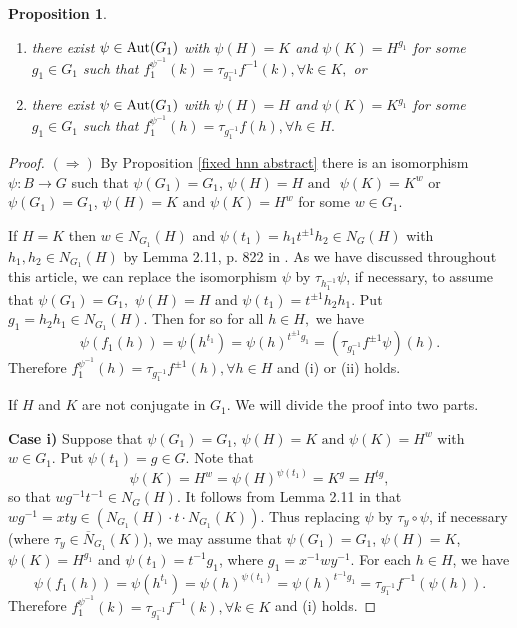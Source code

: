 \documentclass[a4paper,12pt]{article}
\newtheorem{prop}[thm]{Proposition}
\def\aut {{\rm Aut}}
\begin{document}
{\begin{prop}
\begin{enumerate}
\item [(i)] there exist $\psi\in \aut(G_1)$ with $\psi(H)=K $ and $ \psi(K)=H^{g_1}$ for some $g_1 \in G_1$ such that $f_1^{\psi^{-1}}(k)= \tau_{g_1^{-1}} f^{- 1}(k), \forall k \in K,$ %
or 
\item [(ii)] there exist $\psi\in \aut(G_1)$ with $\psi(H)=H $ and $ \psi(K)=K^{g_1}$ for some $g_1 \in G_1$ such that $f_1^{\psi^{-1}}(h)= \tau_{g_1^{-1}} f(h), \forall h \in H.$ 
\end{enumerate}



\end{prop}

\begin{proof}
$(\Rightarrow)$ By Proposition \ref{fixed hnn abstract} there is an isomorphism $\psi: B \longrightarrow G$ such that $\psi(G_1) = G_1$,  $\psi(H)=H \mbox{ and }$ $\psi(K)=K^{w}$ or  $\psi(G_1) = G_1$, $\psi(H)=K \mbox{ and } \psi(K)=H^{w}$ for some $w\in G_1$.  

 If $H=K$ then $w\in N_{G_{1}}(H)$ and $\psi(t_1)=h_1t^{\pm 1}h_2\in N_{G}(H)$ with $h_1, h_2 \in N_{G_1}(H)$ by Lemma 2.11, p. 822 in \cite{BZ}.  As we have discussed throughout this article, we can replace the isomorphism $\psi$ by $\tau_{h_{1}^{-1}}\psi$, if necessary, to assume that $\psi(G_1)=G_1,$
  $\psi(H)=H$ and $\psi(t_1)= t^{\pm 1}h_2h_1.$ Put $g_1=h_2h_1 \in N_{G_1}(H)$. Then for  so for all $h \in H,$ we have $$\psi(f_1(h))=\psi(h^{t_1})=\psi(h)^{t^{\pm 1}g_1}=(\tau_{g_1^{-1}}f^{\pm 1}  \psi)(h).$$ 
 Therefore $f_1^{\psi^{-1}}(h) = \tau_{g_1^{-1}}f^{\pm 1}(h), \forall h \in H$ and (i) or (ii) holds. 

If $H$ and $K$ are not conjugate in $G_1$. We will divide the proof  into two parts.
  
 \textbf{ Case i)} Suppose that $\psi(G_1) = G_1$, $\psi(H)=K \mbox{ and } \psi(K)=H^{w}$ with $w\in G_1$.  Put $\psi(t_1) = g \in G$. Note that $$\psi(K) = H^{w}=\psi(H)^{\psi(t_1)}=K^g=H^{tg},$$ so that $w g^{-1} t^{-1} \in N_G(H)$. It follows from Lemma 2.11 in \cite{BZ} that $w g^{-1}=xty \in \left( N_{G_1}(H) \cdot t \cdot N_{G_1}(K) \right)$. Thus replacing $\psi$ by $\tau_y \circ \psi$, if necessary (where $\tau_y \in \overline{N}_{G_1}(K)$), we may assume that  $\psi(G_1)=G_1$, $\psi(H)=K$, $\psi(K)=H^{g_1}$ and $\psi(t_1)=t^{-1}g_1$, where $g_1=x^{-1}wy^{-1}.$ %
 For each $h \in H$, we have $$\psi(f_1(h))=\psi(h^{t_1})=\psi(h)^{\psi(t_1)}=\psi(h)^{t^{-1}g_1}=\tau_{g_1^{-1}} f^{-1}(\psi(h)).$$ 
 Therefore $f_1^{\psi^{-1}}(k)= \tau_{g_{1}^{-1}} f^{- 1}(k), \forall k \in K$ and (i) holds.
 

\end{proof}}
\end{document}
